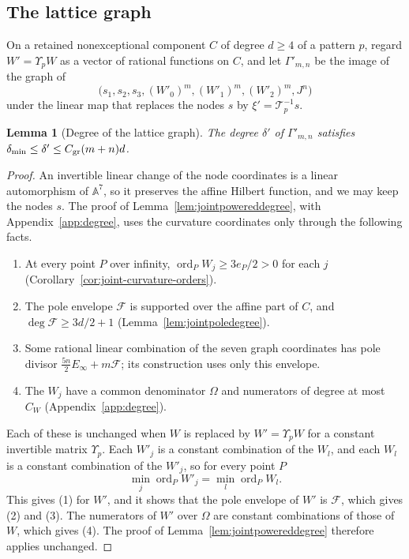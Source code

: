 \documentclass[11pt]{article}
\newtheorem{lemma}[theorem]{Lemma}
\theoremstyle{definition}
\theoremstyle{remark}
\begin{document}
\subsection{The lattice graph}\label{sec:latticegraph}
On a retained nonexceptional component $C$ of degree $d\ge4$ of a pattern $p$, regard
$W'=\Upsilon_pW$ as a vector of rational functions on $C$, and let $\Gamma'_{m,n}$ be the image of the
graph of
\[
 \bigl(s_1,s_2,s_3,(W'_0)^m,(W'_1)^m,(W'_2)^m,J^n\bigr)
\]
under the linear map that replaces the nodes $s$ by $\xi'=\mathcal T_p^{-1}s$.

\begin{lemma}[Degree of the lattice graph]\label{lem:latticedegree}
The degree $\delta'$ of $\Gamma'_{m,n}$ satisfies
$\delta_{\min}\le\delta'\le C_{\rm gr}(m+n)d$.
\end{lemma}

\begin{proof}
An invertible linear change of the node coordinates is a linear automorphism of
$\mathbb A^7$, so it preserves the affine Hilbert function, and we may keep the nodes $s$. The
proof of Lemma~\ref{lem:jointpowereddegree}, with Appendix~\ref{app:degree}, uses the curvature
coordinates only through the following facts.
\begin{enumerate}
\item At every point $P$ over infinity, $\operatorname{ord}_PW_j\ge3e_P/2>0$ for each $j$
(Corollary~\ref{cor:joint-curvature-orders}).
\item The pole envelope $\mathcal F$ is supported over the affine part of $C$, and
$\deg\mathcal F\ge3d/2+1$ (Lemma~\ref{lem:jointpoledegree}).
\item Some rational linear combination of the seven graph coordinates has pole divisor
$\frac{5n}2E_\infty+m\mathcal F$; its construction uses only this envelope.
\item The $W_j$ have a common denominator $\Omega$ and numerators of degree at most $C_W$
(Appendix~\ref{app:degree}).
\end{enumerate}
Each of these is unchanged when $W$ is replaced by $W'=\Upsilon_pW$ for a constant invertible matrix
$\Upsilon_p$. Each $W'_j$ is a constant combination of the $W_l$, and each $W_l$ is a constant
combination of the $W'_j$, so for every point $P$
\[
 \min_j\operatorname{ord}_PW'_j=\min_l\operatorname{ord}_P W_l .
\]
This gives (1) for $W'$, and it shows that the pole envelope of $W'$ is $\mathcal F$, which gives
(2) and (3). The numerators of $W'$ over $\Omega$ are constant combinations of those of $W$,
which gives (4). The proof of Lemma~\ref{lem:jointpowereddegree} therefore applies unchanged.
\end{proof}
\end{document}
